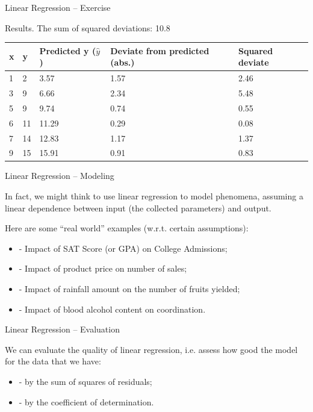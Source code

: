 \documentclass{beamer}
\begin{document}

\begin{frame}
{\centerline{Linear Regression -- Exercise}}

Results. The sum of squared deviations: 10.8
\small
\begin{table}[]
\centering
\begin{tabular}{l | l | l | l| l} 
\hline
x & y & Predicted y ($\hat{y}$) & Deviate from predicted (abs.) & Squared deviate \\
\hline

1 & 2 & 3.57 & 1.57 & 2.46 \\
3 & 9 & 6.66 & 2.34 & 5.48 \\
5 & 9 & 9.74 & 0.74 & 0.55 \\
6 & 11 & 11.29 & 0.29 & 0.08 \\
7 & 14 & 12.83 & 1.17 & 1.37 \\
9 & 15 & 15.91 & 0.91 & 0.83 \\

\hline

\end{tabular}
\end{table}
\end{frame}


\begin{frame}
{\centerline{Linear Regression -- Modeling}}
In fact, we might think to use linear regression to model phenomena, assuming a linear dependence between input (the collected parameters) and output. 

Here are some “real world” examples (w.r.t. certain assumptions):

\begin{itemize}
\item - Impact of SAT Score (or GPA) on College Admissions;
\item - Impact of product price on number of sales;
\item - Impact of rainfall amount on the number of fruits yielded;
\item - Impact of blood alcohol content on coordination.
\end{itemize}

\end{frame}


\begin{frame}
{\centerline{Linear Regression -- Evaluation}}
We can evaluate the quality of linear regression, i.e. assess how good the model for the data that we have:

\begin{itemize}
\item - by the sum of squares of residuals;
\item - by the coefficient of determination.
\end{itemize}



\end{frame}
\end{document}
